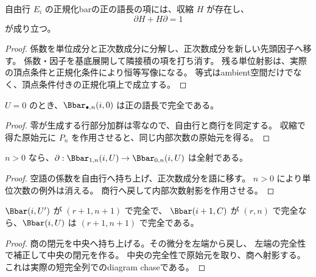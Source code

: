 \begin{lemma}[正規化自由行barの収縮]\label{lem:bar-contraction}
\leanok
{}
自由行 $E_i$ の正規化barの正の語長の項には、収縮 $H$ が存在し、
\[
 \partial H+H\partial=1
\]
が成り立つ。
\end{lemma}
\begin{proof}\leanok
係数を単位成分と正次数成分に分解し、正次数成分を新しい先頭因子へ移す。
係数・因子を基底展開して隣接積の項を打ち消す。
残る単位射影は、実際の頂点条件と正規化条件により恒等写像になる。
等式はambient空間だけでなく、頂点条件付きの正規化項上で成立する。
\end{proof}

\begin{lemma}[自由行の内部次数別完全性]\label{lem:bar-free}
\leanok
{}
$U=0$ のとき、$\Bbar_{\bullet,n}(i,0)$ は正の語長で完全である。
\end{lemma}
\begin{proof}\leanok
零が生成する行部分加群は零なので、自由行と商行を同定する。
収縮で得た原始元に $P_n$ を作用させると、同じ内部次数の原始元を得る。
\end{proof}

\begin{lemma}[語長0の基底となる消滅]\label{lem:bar-zero}
\leanok
{}
$n>0$ なら、$\partial:\Bbar_{1,n}(i,U)\to\Bbar_{0,n}(i,U)$ は全射である。
\end{lemma}
\begin{proof}\leanok
空語の係数を自由行へ持ち上げ、正次数成分を語に移す。
$n>0$ により単位次数の例外は消える。
商行へ戻して内部次数射影を作用させる。
\end{proof}

\begin{lemma}[完全性のfiltrationステップ]\label{lem:bar-step}
\leanok
{}
$\Bbar(i,U')$ が $(r+1,n+1)$ で完全で、
$\Bbar(i+1,C)$ が $(r,n)$ で完全なら、$\Bbar(i,U)$ は $(r+1,n+1)$ で完全である。
\end{lemma}
\begin{proof}\leanok
商の閉元を中央へ持ち上げる。その微分を左端から戻し、
左端の完全性で補正して中央の閉元を作る。
中央の完全性で原始元を取り、商へ射影する。
これは実際の短完全列でのdiagram chaseである。
\end{proof}

